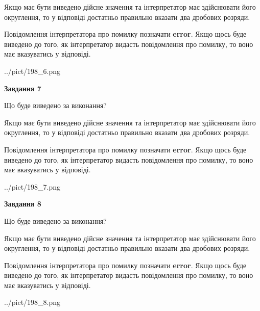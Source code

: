 \documentclass[12pt, ukrainian]{article}
\begin{document}
{\begin {Large}
Якщо має бути виведено дійсне значення та інтерпретатор має здійснювати його округлення, 
то у відповіді достатньо правильно вказати два дробових розряди.

Повідомлення інтерпретатора про помилку позначати \textbf{error}.
Якщо щось буде виведено до того, як інтерпретатор видасть повідомлення про помилку, 
то воно має вказуватись у відповіді. \par

\begin{center}
	{../pict/198_6.png}
\end{center}
\newpage

{\begin {center}\textbf{Завдання 7}\end {center}}\par
Що буде виведено за виконання? \par

Якщо має бути виведено дійсне значення та інтерпретатор має здійснювати його округлення, 
то у відповіді достатньо правильно вказати два дробових розряди.

Повідомлення інтерпретатора про помилку позначати \textbf{error}.
Якщо щось буде виведено до того, як інтерпретатор видасть повідомлення про помилку, 
то воно має вказуватись у відповіді. \par

\begin{center}
	{../pict/198_7.png}
\end{center}
\newpage

{\begin {center}\textbf{Завдання 8}\end {center}}\par
Що буде виведено за виконання? \par

Якщо має бути виведено дійсне значення та інтерпретатор має здійснювати його округлення, 
то у відповіді достатньо правильно вказати два дробових розряди.

Повідомлення інтерпретатора про помилку позначати \textbf{error}.
Якщо щось буде виведено до того, як інтерпретатор видасть повідомлення про помилку, 
то воно має вказуватись у відповіді. \par

\begin{center}
	{../pict/198_8.png}
\end{center}
\newpage


\end{Large}}
\end{document}
